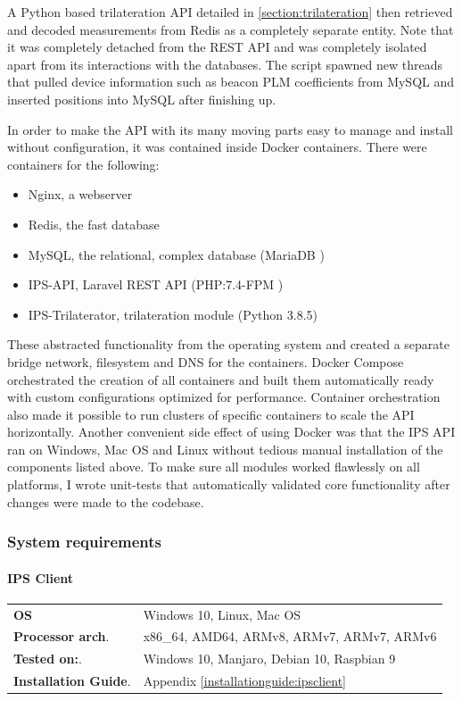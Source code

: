 \documentclass[a4paper, oneside]{ipsreport}
\begin{document}
A Python based trilateration API detailed in \ref{section:trilateration} then retrieved and decoded measurements from Redis as a completely separate entity. Note that it was completely detached from the REST API and was completely isolated apart from its interactions with the databases. The script spawned new threads that pulled device information such as beacon PLM coefficients from MySQL and inserted positions into MySQL after finishing up.

In order to make the API with its many moving parts easy to manage and install without configuration, it was contained inside Docker containers. There were containers for the following:

\begin{itemize}
	\item Nginx, a webserver
	\item Redis, the fast database
	\item MySQL, the relational, complex database (MariaDB )
	\item IPS-API, Laravel REST API (PHP:7.4-FPM )
	\item IPS-Trilaterator, trilateration module (Python 3.8.5)
\end{itemize}

These abstracted functionality from the operating system and created a separate bridge network, filesystem and DNS for the containers. Docker Compose orchestrated the creation of all containers and built them automatically ready with custom configurations optimized for performance. Container orchestration also made it possible to run clusters of specific containers to scale the API horizontally. Another convenient side effect of using Docker was that the IPS API ran on Windows, Mac OS and Linux without tedious manual installation of the components listed above. To make sure all modules worked flawlessly on all platforms, I wrote unit-tests that automatically validated core functionality after changes were made to the codebase.

\subsubsection{System requirements}
\paragraph{IPS Client}
\begin{tabular}{ll}
\textbf{OS} & Windows 10, Linux, Mac OS \\
\textbf{Processor arch}. & x86\_64, AMD64, ARMv8, ARMv7, ARMv7, ARMv6 \\
\textbf{Tested on:}. & Windows 10, Manjaro, Debian 10, Raspbian 9\\
\textbf{Installation Guide}. & Appendix \ref{installationguide:ipsclient}\\
\end{tabular}
\end{document}
